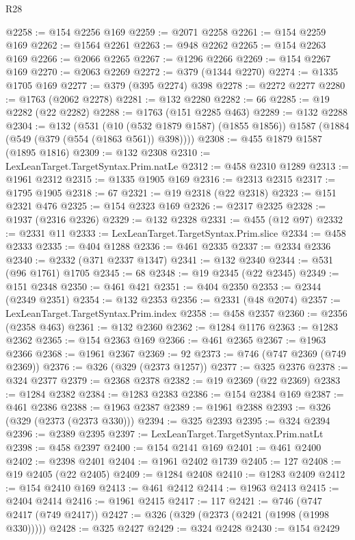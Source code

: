 \begin{lexlean}{R28}
\begin{coremodule}
@2258 := @154 @2256 @169
@2259 := @2071 @2258
@2261 := @154 @2259 @169
@2262 := @1564 @2261
@2263 := @948 @2262
@2265 := @154 @2263 @169
@2266 := @2066 @2265
@2267 := @1296 @2266
@2269 := @154 @2267 @169
@2270 := @2063 @2269
@2272 := @379 (@1344 @2270)
@2274 := @1335 @1705 @169
@2277 := @379 (@395 @2274) @398
@2278 := @2272 @2277
@2280 := @1763 (@2062 @2278)
@2281 := @132 @2280
@2282 := 66
@2285 := @19 @2282 (@22 @2282)
@2288 := @1763 (@151 @2285 @463)
@2289 := @132 @2288
@2304 := @132
    (@531
      (@10 (@532 @1879 @1587) (@1855 @1856))
      @1587
      (@1884 (@549 (@379 (@554 (@1863 @561)) @398))))
@2308 := @455 @1879 @1587 (@1895 @1816)
@2309 := @132 @2308
@2310 := LexLeanTarget.TargetSyntax.Prim.natLe
@2312 := @458 @2310 @1289
@2313 := @1961 @2312
@2315 := @1335 @1905 @169
@2316 := @2313 @2315
@2317 := @1795 @1905
@2318 := 67
@2321 := @19 @2318 (@22 @2318)
@2323 := @151 @2321 @476
@2325 := @154 @2323 @169
@2326 := @2317 @2325
@2328 := @1937 (@2316 @2326)
@2329 := @132 @2328
@2331 := @455 (@12 @97)
@2332 := @2331 @11
@2333 := LexLeanTarget.TargetSyntax.Prim.slice
@2334 := @458 @2333
@2335 := @404 @1288
@2336 := @461 @2335
@2337 := @2334 @2336
@2340 := @2332 (@371 @2337 @1347)
@2341 := @132 @2340
@2344 := @531 (@96 @1761) @1705
@2345 := 68
@2348 := @19 @2345 (@22 @2345)
@2349 := @151 @2348
@2350 := @461 @421
@2351 := @404 @2350
@2353 := @2344 (@2349 @2351)
@2354 := @132 @2353
@2356 := @2331 (@48 @2074)
@2357 := LexLeanTarget.TargetSyntax.Prim.index
@2358 := @458 @2357
@2360 := @2356 (@2358 @463)
@2361 := @132 @2360
@2362 := @1284 @1176
@2363 := @1283 @2362
@2365 := @154 @2363 @169
@2366 := @461 @2365
@2367 := @1963 @2366
@2368 := @1961 @2367
@2369 := 92
@2373 := @746 (@747 @2369 (@749 @2369))
@2376 := @326 (@329 (@2373 @1257))
@2377 := @325 @2376
@2378 := @324 @2377
@2379 := @2368 @2378
@2382 := @19 @2369 (@22 @2369)
@2383 := @1284 @2382
@2384 := @1283 @2383
@2386 := @154 @2384 @169
@2387 := @461 @2386
@2388 := @1963 @2387
@2389 := @1961 @2388
@2393 := @326 (@329 (@2373 (@2373 @330)))
@2394 := @325 @2393
@2395 := @324 @2394
@2396 := @2389 @2395
@2397 := LexLeanTarget.TargetSyntax.Prim.natLt
@2398 := @458 @2397
@2400 := @154 @2141 @169
@2401 := @461 @2400
@2402 := @2398 @2401
@2404 := @1961 @2402 @1739
@2405 := 127
@2408 := @19 @2405 (@22 @2405)
@2409 := @1284 @2408
@2410 := @1283 @2409
@2412 := @154 @2410 @169
@2413 := @461 @2412
@2414 := @1963 @2413
@2415 := @2404 @2414
@2416 := @1961 @2415
@2417 := 117
@2421 := @746 (@747 @2417 (@749 @2417))
@2427 := @326 (@329 (@2373 (@2421 (@1998 (@1998 @330)))))
@2428 := @325 @2427
@2429 := @324 @2428
@2430 := @154 @2429

\end{coremodule}
\end{lexlean}
